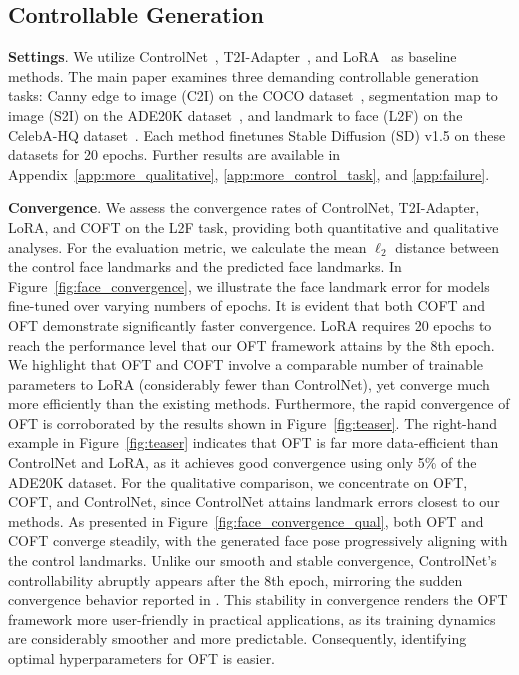 \subsection{Controllable Generation}

\textbf{Settings}. We utilize ControlNet~\cite{zhang2023adding}, T2I-Adapter~\cite{mou2023t2i}, and LoRA~\cite{hulora2022} as baseline methods. The main paper examines three demanding controllable generation tasks: Canny edge to image (C2I) on the COCO dataset~\cite{lin2014microsoft}, segmentation map to image (S2I) on the ADE20K dataset~\cite{zhou2017scene}, and landmark to face (L2F) on the CelebA-HQ dataset~\cite{karras2018progressive,xia2021tedigan}. Each method finetunes Stable Diffusion (SD) v1.5 on these datasets for 20 epochs. Further results are available in Appendix~\ref{app:more_qualitative}, \ref{app:more_control_task}, and \ref{app:failure}.

\textbf{Convergence}. We assess the convergence rates of ControlNet, T2I-Adapter, LoRA, and COFT on the L2F task, providing both quantitative and qualitative analyses. For the evaluation metric, we calculate the mean $\ell_2$ distance between the control face landmarks and the predicted face landmarks. In Figure~\ref{fig:face_convergence}, we illustrate the face landmark error for models fine-tuned over varying numbers of epochs. It is evident that both COFT and OFT demonstrate significantly faster convergence. LoRA requires 20 epochs to reach the performance level that our OFT framework attains by the 8th epoch. We highlight that OFT and COFT involve a comparable number of trainable parameters to LoRA (considerably fewer than ControlNet), yet converge much more efficiently than the existing methods. Furthermore, the rapid convergence of OFT is corroborated by the results shown in Figure~\ref{fig:teaser}. The right-hand example in Figure~\ref{fig:teaser} indicates that OFT is far more data-efficient than ControlNet and LoRA, as it achieves good convergence using only 5\% of the ADE20K dataset. For the qualitative comparison, we concentrate on OFT, COFT, and ControlNet, since ControlNet attains landmark errors closest to our methods. As presented in Figure~\ref{fig:face_convergence_qual}, both OFT and COFT converge steadily, with the generated face pose progressively aligning with the control landmarks. Unlike our smooth and stable convergence, ControlNet’s controllability abruptly appears after the 8th epoch, mirroring the sudden convergence behavior reported in \cite{zhang2023adding}. This stability in convergence renders the OFT framework more user-friendly in practical applications, as its training dynamics are considerably smoother and more predictable. Consequently, identifying optimal hyperparameters for OFT is easier.

